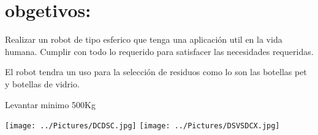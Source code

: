 \documentclass[12pt,a4paper]{article}
\begin{document}
\section{obgetivos:}Realizar un robot de tipo esferico que tenga una aplicación util en la vida humana.
\linebreak
Cumplir con todo lo requerido para satisfacer las necesidades requeridas.
\linebreak

El robot tendra un uso para la selección de residuos como lo son las botellas pet y botellas de vidrio.
\linebreak

Levantar minimo 500Kg

\texttt{[image: ../Pictures/DCDSC.jpg]} 
\texttt{[image: ../Pictures/DSVSDCX.jpg]} 
\end{document}
